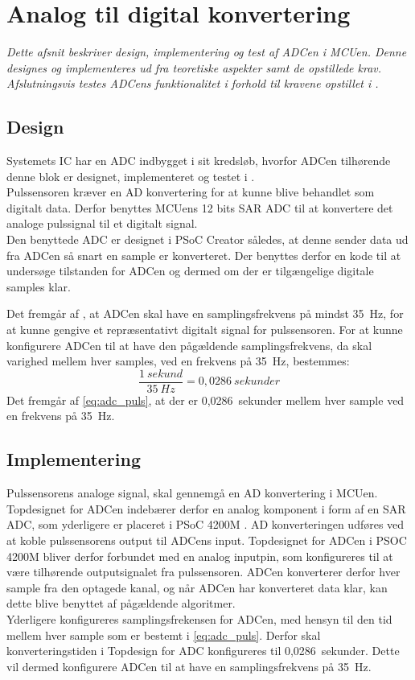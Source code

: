 \section{Analog til digital konvertering} \label{adc_design_impl}
\textit{Dette afsnit beskriver design, implementering og test af ADCen i MCUen. Denne designes og implementeres ud fra teoretiske aspekter samt de opstillede krav. Afslutningsvis testes ADCens funktionalitet i forhold til kravene opstillet i .}

\subsection{Design}
Systemets IC har en ADC indbygget i sit kredsløb, hvorfor ADCen tilhørende denne blok er designet, implementeret og testet i .\\
Pulssensoren kræver en AD konvertering for at kunne blive behandlet som digitalt data. Derfor benyttes MCUens 12 bits SAR ADC til at konvertere det analoge pulssignal til et digitalt signal. \\
Den benyttede ADC er designet i PSoC Creator således, at denne sender data ud fra ADCen så snart en sample er konverteret. Der benyttes derfor en kode til at undersøge tilstanden for ADCen og dermed om der er tilgængelige digitale samples klar. 

Det fremgår af , at ADCen skal have en samplingsfrekvens på mindst 35~Hz, for at kunne gengive et repræsentativt digitalt signal for pulssensoren. For at kunne konfigurere ADCen til at have den pågældende samplingsfrekvens, da skal varighed mellem hver samples, ved en frekvens på 35~Hz, bestemmes:
\begin{equation}
\frac{1~sekund}{35~Hz} = 0,0286~sekunder
\label{eq:adc_puls}
\end{equation}
Det fremgår af \eqref{eq:adc_puls}, at der er 0,0286~sekunder mellem hver sample ved en frekvens på 35~Hz. 

\subsection{Implementering}
Pulssensorens analoge signal, skal gennemgå en AD konvertering i MCUen. Topdesignet for ADCen indebærer derfor en analog komponent i form af en SAR ADC, som yderligere er placeret i PSoC 4200M \citep{Murphy2016}. AD konverteringen udføres ved at koble pulssensorens output til ADCens input. Topdesignet for ADCen i PSOC 4200M bliver derfor forbundet med en analog inputpin, som konfigureres til at være tilhørende outputsignalet fra pulssensoren. ADCen konverterer derfor hver sample fra den optagede kanal, og når ADCen har konverteret data klar, kan dette blive benyttet af pågældende algoritmer. \\
Yderligere konfigureres samplingsfrekensen for ADCen, med hensyn til den tid mellem hver sample som er bestemt i \eqref{eq:adc_puls}. Derfor skal konverteringstiden i Topdesign for ADC konfigureres til 0,0286~sekunder. Dette vil dermed konfigurere ADCen til at have en samplingsfrekvens på 35~Hz.


